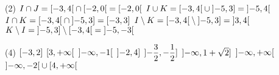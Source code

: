 \documentclass[a4paper,12pt]{report}
\begin{document}
\vspace*{-2\baselineskip}
\begin{core}
	\phantom{}
	\begin{tasks}(2)
		\task $I\cap J=\interval[open right]{-3}{4}\cap \interval[open right]{-2}{0}=\interval[open right]{-2}{0}$ 
		\task $I\cup K=\interval[open right]{-3}{4}\cup \interval[open left]{-5}{3}=\interval[open]{-5}{4}$
		\task $I\cap K=\interval[open right]{-3}{4}\cap \interval[open left]{-5}{3} = \interval[]{-3}{3}$
		\task $I\setminus K=\interval[open right]{-3}{4}\setminus \interval[open left]{-5}{3}=\interval[open]{3}{4}$
		\task $K\setminus I=\interval[open left]{-5}{3}\setminus \interval[open right]{-3}{4}=\interval[open]{-5}{-3}$
	\end{tasks}
\end{core}
\begin{core}
	\phantom{}
	\begin{tasks}(4)
		\task $\interval[]{-3}{2}$
		\task $\interval[open right]{3}{+\infty}$
		\task $\interval[open]{-\infty}{-1}$
		\task $\interval[open left]{-2}{4}$
		\task $\interval[open left]{-\dfrac{3}{2}}{-\dfrac{1}{2}}$
		\task $\interval[open left]{-\infty}{1+\sqrt{2}}$
		\task $\interval[open]{-\infty}{+\infty}$
		\task $\interval[open]{-\infty}{-2}\cup \interval[open right]{4}{+\infty}$
	\end{tasks}
\end{core}
\def\firstcircle{(0,0) circle (1cm)}
\def\thirdcircle{(0:1cm) circle (1cm)}
\end{document}
